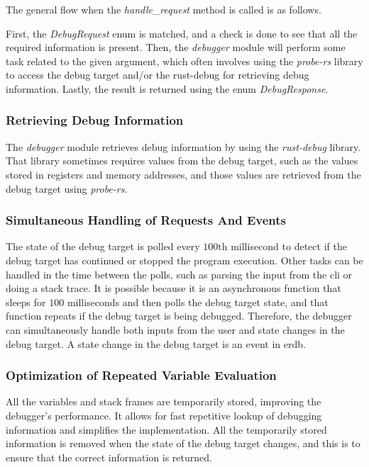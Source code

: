 The general flow when the \emph{handle\_request} method is called is as follows.


First, the \emph{DebugRequest} enum is matched, and a check is done to see that all the required information is present.
Then, the \emph{debugger} module will perform some task related to the given argument, which often involves using the \emph{probe-rs} library to access the debug target and/or the rust-debug for retrieving debug information.
Lastly, the result is returned using the enum \emph{DebugResponse}.



\subsubsection{Retrieving Debug Information}
The \emph{debugger} module retrieves debug information by using the \emph{rust-debug} library.
That library sometimes requires values from the debug target, such as the values stored in registers and memory addresses, and those values are retrieved from the debug target using \emph{probe-rs}.



\subsubsection{Simultaneous Handling of Requests And Events}
The state of the debug target is polled every $100\text{th}$ millisecond to detect if the debug target has continued or stopped the program execution.
Other tasks can be handled in the time between the polls, such as parsing the input from the \acrshort{cli} or doing a stack trace.
It is possible because it is an asynchronous function that sleeps for $100$ milliseconds and then polls the debug target state, and that function repeats if the debug target is being debugged.
Therefore, the debugger can simultaneously handle both inputs from the user and state changes in the debug target.
A state change in the debug target is an event in \gls{erdb}.



\subsubsection{Optimization of Repeated Variable Evaluation}
All the variables and stack frames are temporarily stored, improving the debugger's performance.
It allows for fast repetitive lookup of debugging information and simplifies the implementation.
All the temporarily stored information is removed when the state of the debug target changes, and this is to ensure that the correct information is returned.


